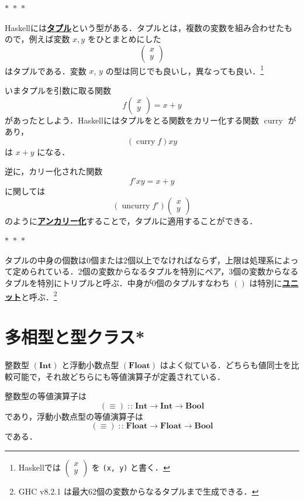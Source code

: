 \documentclass[a5paper,twoside,fleqn,draft]{jsbook}
\newcommand{\separator}{\begin{center}$*$~$*$~$*$\end{center}}
\newcommand{\programminglanguage}[1]{\textsf{#1}}
\newcommand{\haskell}{\programminglanguage{Haskell}}
\newcommand{\keyword}[1]{{\underline{\textbf{#1}}}}
\newcommand{\code}[1]{\texttt{#1}}
\newcommand{\mSpecialFunc}[1]{\mathrm{#1}}
\DeclareMathOperator{\mCurry}{\mSpecialFunc{curry}}
\DeclareMathOperator{\mUncurry}{\mSpecialFunc{uncurry}}
\DeclareMathOperator{\mFuncArrow}{\rightarrow}
\DeclareMathOperator{\mIn}{{:\!:}}
\newcommand{\mType}[1]{\mathbf{#1}} %
\newcommand{\mBoolType}{\mType{Bool}}
\newcommand{\mFloatType}{\mType{Float}}
\newcommand{\mIntType}{\mType{Int}}
\newcommand{\mPairWith}[2]{\begin{pmatrix}#1\\#2\end{pmatrix}}
\begin{document}
\separator

\haskell には\keyword{タプル}という型がある．タプルとは，複数の変数を組み合わせたもので，例えば変数 $x,y$ をひとまとめにした
\begin{equation}
  \mPairWith{x}{y}
\end{equation}
はタプルである．変数 $x$, $y$ の型は同じでも良いし，異なっても良い．\footnote{\haskell では $\mPairWith{x}{y}$ を \code{(x, y)} と書く．}

いまタプルを引数に取る関数
\begin{equation}
  f\mPairWith{x}{y}
  =x+y
\end{equation}
があったとしよう．\haskell にはタプルをとる関数をカリー化する関数 $\mCurry$ があり，
\begin{equation}
  (\mCurry f)xy
\end{equation}
は $x+y$ になる．

逆に，カリー化された関数
\begin{equation}
  f'xy
  =x+y
\end{equation}
に関しては
\begin{equation}
  (\mUncurry f')\mPairWith{x}{y}
\end{equation}
のように\keyword{アンカリー化}することで，タプルに適用することができる．

\separator

タプルの中身の個数は0個または2個以上でなければならず，上限は処理系によって定められている．2個の変数からなるタプルを特別にペア，3個の変数からなるタプルを特別にトリプルと呼ぶ．中身が0個のタプルすなわち $()$ は特別に\keyword{ユニット}と呼ぶ．\footnote{GHC v8.2.1 は最大62個の変数からなるタプルまで生成できる．}

\section{多相型と型クラス*}

整数型 $(\mIntType)$ と浮動小数点型 $(\mFloatType)$ はよく似ている．どちらも値同士を比較可能で，それ故どちらにも等値演算子が定義されている．

整数型の等値演算子は
\begin{equation}
  (\equiv)
  \mIn\mIntType\mFuncArrow\mIntType\mFuncArrow\mBoolType
\end{equation}
であり，浮動小数点型の等値演算子は
\begin{equation}
  (\equiv)
  \mIn\mFloatType\mFuncArrow\mFloatType\mFuncArrow\mBoolType
\end{equation}
である．
\end{document}

